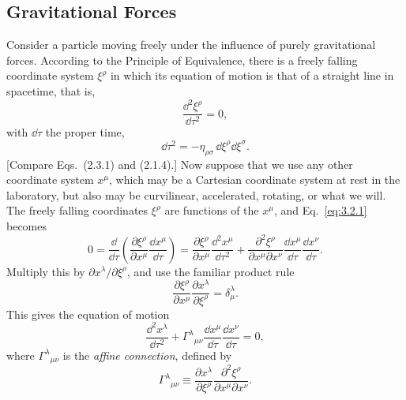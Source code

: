 
\subsection{Gravitational Forces}\label{sec:3.2}

Consider a particle moving freely under the influence of purely
gravitational forces. According to the Principle of Equivalence, there is a
freely falling coordinate system $\xi^\rho$ in which its equation of motion
is that of a straight line in spacetime, that is,
\begin{equation}
  \frac{\dd^2\xi^\rho}{\dd\tau^2}=0,
  \tag{3.2.1}\label{eq:3.2.1}
\end{equation}
with $\dd\tau$ the proper time,
\begin{equation}
  \dd\tau^2=-\eta_{\rho\sigma}\,\dd\xi^\rho\dd\xi^\sigma.
  \tag{3.2.2}\label{eq:3.2.2}
\end{equation}
[Compare Eqs.~(2.3.1) and (2.1.4).] Now suppose that we use any other
coordinate system $x^\mu$, which may be a Cartesian coordinate system at
rest in the laboratory, but also may be curvilinear, accelerated, rotating,
or what we will. The freely falling coordinates $\xi^\rho$ are functions of
the $x^\mu$, and Eq.~\eqref{eq:3.2.1} becomes
\[
  0=\frac{\dd}{\dd\tau}
  \left(\frac{\partial\xi^\rho}{\partial x^\mu}
  \frac{\dd x^\mu}{\dd\tau}\right)
  =\frac{\partial\xi^\rho}{\partial x^\mu}
  \frac{\dd^2x^\mu}{\dd\tau^2}
  +\frac{\partial^2\xi^\rho}{\partial x^\mu\partial x^\nu}
  \frac{\dd x^\mu}{\dd\tau}\frac{\dd x^\nu}{\dd\tau}.
\]
Multiply this by $\partial x^\lambda/\partial\xi^\rho$, and use the
familiar product rule
\[
  \frac{\partial\xi^\rho}{\partial x^\mu}
  \frac{\partial x^\lambda}{\partial\xi^\rho}
  =\delta^\lambda_\mu.
\]
This gives the equation of motion
\begin{equation}
  \frac{\dd^2x^\lambda}{\dd\tau^2}
  +\Gamma^\lambda{}_{\mu\nu}
  \frac{\dd x^\mu}{\dd\tau}\frac{\dd x^\nu}{\dd\tau}=0,
  \tag{3.2.3}\label{eq:3.2.3}
\end{equation}
where $\Gamma^\lambda{}_{\mu\nu}$ is the \emph{affine connection}, defined by
\begin{equation}
  \Gamma^\lambda{}_{\mu\nu}
  \equiv
  \frac{\partial x^\lambda}{\partial\xi^\rho}
  \frac{\partial^2\xi^\rho}{\partial x^\mu\partial x^\nu}.
  \tag{3.2.4}\label{eq:3.2.4}
\end{equation}

